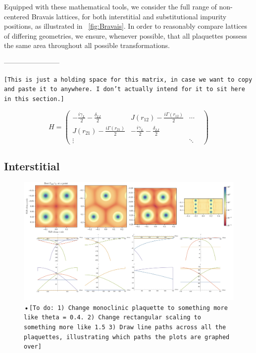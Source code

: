 \documentclass[aps,pra,superscriptaddress,twocolumn]{revtex4-1}
\newcommand{\fref}[1]{\text{Fig.}~\ref{#1}}
\newcommand{\commentSB}[1]{\texttt{\color{blue}[#1]}}
\begin{document}
Equipped with these mathematical tools, we consider the full range of non-centered Bravais lattices, for both interstitial and substitutional impurity positions, as illustrated in \fref{fig:Bravais}. In order to reasonably compare lattices of differing geometries, we ensure, whenever possible, that all plaquettes possess the same area throughout all possible transformations. 


------------------------

\commentSB{This is just a holding space for this matrix, in case we want to copy and paste it to anywhere. I don't actually intend for it to sit here in this section.}

\begin{equation}
    H = 
    \begin{pmatrix}
        -\frac{i \gamma_L}{2} - \frac{\delta_{LI}}{2} & J(r_{12}) - \frac{i \Gamma(r_{12})}{2} & \cdots \\
        J(r_{21}) - \frac{i \Gamma(r_{21})}{2} & -\frac{i \gamma_L}{2} - \frac{\delta_{LI}}{2} & & \\
        \vdots & & \ddots
    \end{pmatrix}
\end{equation}

\subsection{Interstitial}

\begin{figure}
    \centering
    \includegraphics[width=1.0\textwidth]{figures/interstitial_figure.png} 
    \caption{•\commentSB{To do: 1) Change monoclinic plaquette to something more like theta = 0.4.   2) Change rectangular scaling to something more like 1.5   3) Draw line paths across all the plaquettes, illustrating which paths the plots are graphed over}}
    \label{fig:interstitial}
\end{figure}
\end{document}
